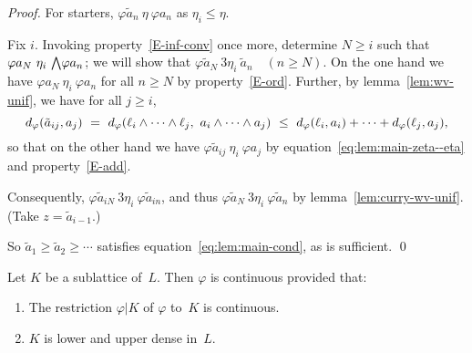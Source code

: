\documentclass[main.tex]{subfiles}
\begin{document}
\begin{proof}
For starters, $\varphi \tilde a_n \ \eta \ \varphi a_n$
as $\eta_i \leq \eta$.

Fix $i$.  
Invoking property~\ref{E-inf-conv} once more,
determine $N\geq i$ such that $\varphi a_N \ \eta_i \ \textstyle{\bigwedge} \varphi a_n$;
we will show that $\varphi\tilde a_N \ 3\eta_i \ \tilde a_n\quad (n\geq N)$.
On the one hand we have $\varphi a_N \ \eta_i\ \varphi a_n$ 
for all $n\geq N$ by property~\ref{E-ord}.
Further,
by lemma~\ref{lem:wv-unif},
we have for all $j\geq i$,
\begin{equation*}
\ld\varphi(\tilde a_{ij},a_j)\ =\ 
\ld\varphi(\ell_i \wedge\dotsb\wedge \ell_j,\  a_i \wedge \dotsb \wedge a_j)
\ \leq\ \ld\varphi(\ell_i,a_i)+\dotsb+\ld\varphi(\ell_j,a_j)\text{,}
\end{equation*}
so that 
on the other hand we have
 $\varphi\tilde a_{ij} \ \eta_i\ \varphi a_j$
by equation~\eqref{eq:lem:main-zeta--eta} and property~\ref{E-add}.

Consequently, $\varphi \tilde a_{iN} \ 3\eta_i\ \varphi\tilde a_{in}$,
and thus
$\varphi \tilde a_{N} \ 3\eta_i\ \varphi\tilde a_{n}$
by lemma~\ref{lem:curry-wv-unif}.
(Take $z=\tilde a_{i-1}$.)

So $\tilde a_1 \geq \tilde a_2 \geq \dotsb$
satisfies equation~\eqref{eq:lem:main-cond},
as is sufficient. \qed
\end{proof}
\begin{lem}
\label{lem:cont-ext-double}
Let $K$ be a sublattice of~$L$.
Then $\varphi$ is continuous provided that:
\begin{enumerate}
\item
The restriction $\varphi|K$ of $\varphi$ to~$K$ is continuous.
\item
$K$ is lower and upper dense in~$L$.
\end{enumerate}
\end{lem}
\end{document}
